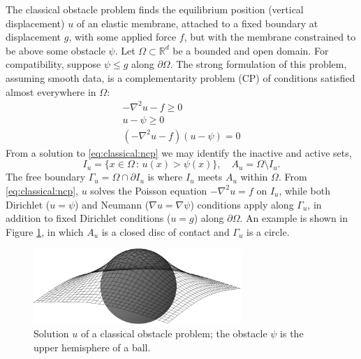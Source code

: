 \documentclass[]{interact}
\theoremstyle{plain}%
\theoremstyle{definition}
\theoremstyle{remark}
\newcommand{\RR}{\mathbb{R}}
\newcommand{\grad}{\nabla}
\begin{document}
The classical obstacle problem \cite{KinderlehrerStampacchia1980} finds the equilibrium position (vertical displacement) $u$ of an elastic membrane, attached to a fixed boundary at displacement $g$, with some applied force $f$, but with the membrane constrained to be above some obstacle $\psi$.  Let $\Omega \subset \RR^d$ be a bounded and open domain.  For compatibility, suppose $\psi \le g$ along $\partial \Omega$.  The strong formulation of this problem, assuming smooth data, is a complementarity problem (CP) of conditions satisfied almost everywhere in $\Omega$:
\begin{subequations} \label{eq:classical:ncp}
\begin{align}
  -\nabla^2 u - f \geq 0 \label{eq:classical:ncp:a} \\
  u - \psi \geq 0\\
  (-\nabla^2u - f)(u - \psi) = 0 \label{eq:classical:ncp:c}
\end{align}
\end{subequations}
From a solution to \eqref{eq:classical:ncp} we may identify the inactive and active sets,
\begin{equation}
  I_u = \{x \in \Omega \,:\, u(x) > \psi(x)\}, \quad A_u = \Omega \setminus I_u. \label{eq:classical:sets}
\end{equation}
The free boundary $\Gamma_u = \Omega \cap \partial I_u$ is where $I_u$ meets $A_u$ within $\Omega$.  From \eqref{eq:classical:ncp}, $u$ solves the Poisson equation $-\nabla^2u = f$ on $I_u$, while both Dirichlet ($u=\psi$) and Neumann ($\grad u = \grad \psi$) conditions apply along $\Gamma_u$, in addition to fixed Dirichlet conditions ($u=g$) along $\partial\Omega$.  An example is shown in Figure \ref{fig:ball}, in which $A_u$ is a closed disc of contact and $\Gamma_u$ is a circle.

\begin{figure}[H]
\centering
\includegraphics[width=0.7\textwidth]{static/obstacle65.pdf}
\caption{Solution $u$ of a classical obstacle problem; the obstacle $\psi$ is the upper hemisphere of a ball.}
\label{fig:ball}
\end{figure}
\end{document}

